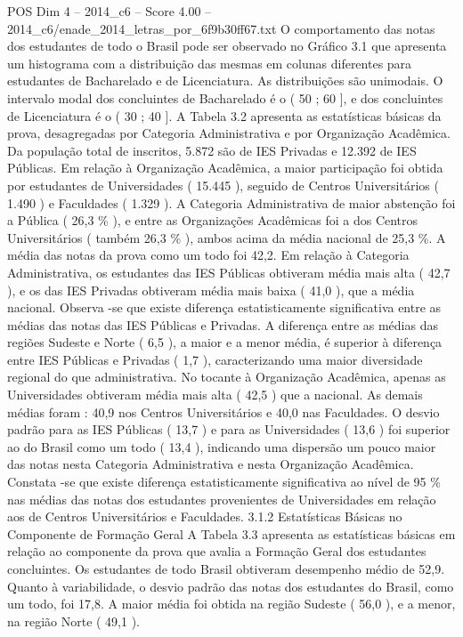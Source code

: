 \begin{textsample}{POS Dim 4 – 2014\_c6 – Score 4.00 – 2014\_c6/enade\_2014\_letras\_por\_6f9b30ff67.txt}
O comportamento das notas dos estudantes de todo o Brasil pode ser observado no Gráfico 3.1 que apresenta um histograma com a distribuição das mesmas em colunas diferentes para estudantes de Bacharelado e de Licenciatura.
As distribuições são unimodais.
O intervalo modal dos concluintes de Bacharelado é o ( 50 ; 60 ], e dos concluintes de Licenciatura é o ( 30 ; 40 ].
A Tabela 3.2 apresenta as estatísticas básicas da prova, desagregadas por Categoria Administrativa e por Organização Acadêmica.
Da população total de inscritos, 5.872 são de IES Privadas e 12.392 de IES Públicas.
Em relação à Organização Acadêmica, a maior participação foi obtida por estudantes de Universidades ( 15.445 ), seguido de Centros Universitários ( 1.490 ) e Faculdades ( 1.329 ).
A Categoria Administrativa de maior abstenção foi a Pública ( 26,3 \% ), e entre as Organizações Acadêmicas foi a dos Centros Universitários ( também 26,3 \% ), ambos acima da média nacional de 25,3 \%.
A média das notas da prova como um todo foi 42,2.
Em relação à Categoria Administrativa, os estudantes das IES Públicas obtiveram média mais alta ( 42,7 ), e os das IES Privadas obtiveram média mais baixa ( 41,0 ), que a média nacional.
Observa -se que existe diferença estatisticamente significativa entre as médias das notas das IES Públicas e Privadas.
A diferença entre as médias das regiões Sudeste e Norte ( 6,5 ), a maior e a menor média, é superior à diferença entre IES Públicas e Privadas ( 1,7 ), caracterizando uma maior diversidade regional do que administrativa.
No tocante à Organização Acadêmica, apenas as Universidades obtiveram média mais alta ( 42,5 ) que a nacional.
As demais médias foram : 40,9 nos Centros Universitários e 40,0 nas Faculdades.
O desvio padrão para as IES Públicas ( 13,7 ) e para as Universidades ( 13,6 ) foi superior ao do Brasil como um todo ( 13,4 ), indicando uma dispersão um pouco maior das notas nesta Categoria Administrativa e nesta Organização Acadêmica.
Constata -se que existe diferença estatisticamente significativa ao nível de 95 \% nas médias das notas dos estudantes provenientes de Universidades em relação aos de Centros Universitários e Faculdades. 3.1.2 Estatísticas Básicas no Componente de Formação Geral A Tabela 3.3 apresenta as estatísticas básicas em relação ao componente da prova que avalia a Formação Geral dos estudantes concluintes.
Os estudantes de todo Brasil obtiveram desempenho médio de 52,9.
Quanto à variabilidade, o desvio padrão das notas dos estudantes do Brasil, como um todo, foi 17,8.
A maior média foi obtida na região Sudeste ( 56,0 ), e a menor, na região Norte ( 49,1 ).

\end{textsample}
